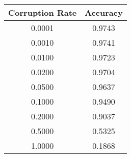 \begin{tabular}{cc}
\toprule
Corruption Rate & Accuracy \\
\midrule
0.0001 & 0.9743 \\
0.0010 & 0.9741 \\
0.0100 & 0.9723 \\
0.0200 & 0.9704 \\
0.0500 & 0.9637 \\
0.1000 & 0.9490 \\
0.2000 & 0.9037 \\
0.5000 & 0.5325 \\
1.0000 & 0.1868 \\
\bottomrule
\end{tabular}

